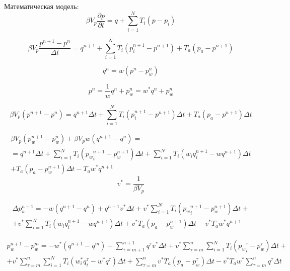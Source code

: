 \documentclass[14pt]{article}
\begin{document}
	Математическая модель:
\begin{equation}\label{mm}
	\beta V_p\frac{\partial p}{\partial t} = q + \sum_{i=1}^{N}T_i\left(p-p_i\right)
\end{equation}

\begin{equation}\label{mm1}
	\beta V_p\frac{p^{n+1} - p^n}{\Delta t} = q^{n+1} + \sum_{i=1}^{N}T_i\left(p_i^{n+1}-p^{n+1}\right) + T_a\left(p_a - p^{n+1}\right)
\end{equation}

\begin{equation}
	q^n = w\left(p^n-p_w^n\right)
\end{equation}

\begin{equation}
	p^n = \frac{1}{w}q^n + p_w^n = w^*q^n + p_w^n
\end{equation}

\begin{equation}
	\beta V_p \left(p^{n+1} - p^n\right) = q^{n+1}\Delta t + \sum_{i=1}^{N}T_i\left(p_i^{n+1}-p^{n+1}\right)\Delta t + T_a\left(p_a - p^{n+1}\right)\Delta t
\end{equation}
	
\begin{eqnarray*}\label{mm2}
	\beta V_p \left(p_w^{n+1} - p_w^n\right) + \beta V_p w\left(q^{n+1} - q^n\right) = \\
	= q^{n+1}\Delta t + \sum_{i=1}^{N} T_i \left({p_w}_i^{n+1}-p_w^{n+1}\right)\Delta t + 
	\sum_{i=1}^{N} T_i \left(w_i q_i^{n+1}-w q^{n+1}\right)\Delta t \\
	+  T_a\left(p_a - p_w^{n+1}\right)\Delta t - T_a w^* q^{n+1}
\end{eqnarray*}
\begin{equation*}
	v^* = \frac{1}{\beta V_p}
\end{equation*}


\begin{eqnarray*}\label{mm3}
 \Delta p_w^{n+1}  = - w\left(q^{n+1} - q^n\right) 
	+ q^{n+1} v^* \Delta t
	+ v^* \sum_{i=1}^{N} T_i \left({p_w}_i^{n+1}-p_w^{n+1}\right)\Delta t + \\
    + v^* \sum_{i=1}^{N} T_i \left(w_i q_i^{n+1}-w q^{n+1}\right)\Delta t 
	+  v^* T_a\left(p_a - p_w^{n+1}\right)\Delta t - v^* T_a w^* q^{n+1}
\end{eqnarray*}

\begin{eqnarray*}\label{mm4}
	p_w^{n+1} - p_w^m  = - w^*\left(q^{n+1} - q^m\right) 
	+ \sum_{\tau=m+1}^{n+1}q^\tau v^* \Delta t
	+ v^* \sum_{\tau=m}^{n}\sum_{i=1}^{N} T_i \left({p_w}_i^\tau-p_w^\tau\right)\Delta t + \\
	+ v^*  \sum_{\tau=m}^{n} \sum_{i=1}^{N} T_i \left(w^*_i q_i^\tau-w^* q^\tau\right)\Delta t 
	+  \sum_{\tau=m}^{n} v^* T_a\left(p_a - p_w^\tau\right)\Delta t - v^* T_a w^*  \sum_{\tau=m}^{n} q^\tau \Delta t
\end{eqnarray*}
\end{document}

